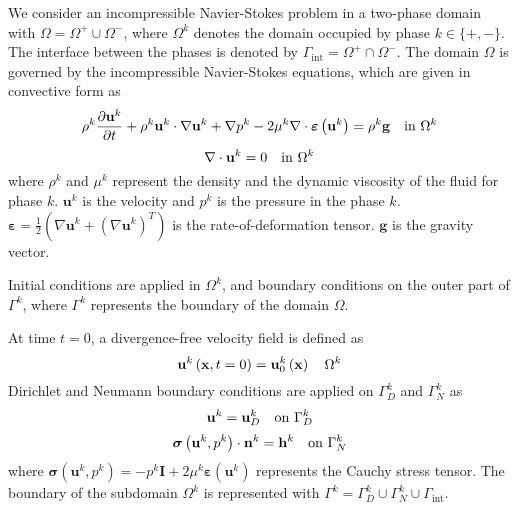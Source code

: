We consider an incompressible Navier-Stokes problem in a two-phase domain with $\Omega = \Omega^{+} \cup \Omega^{-}$, where $\Omega^{k}$ denotes the domain occupied by phase $k \in \lbrace +, - \rbrace$. The interface between the phases is denoted by $\Gamma_{\mathrm{int}} = \Omega^{+} \cap \Omega^{-}$. The domain $\Omega$ is governed by the incompressible Navier-Stokes equations, which are given in convective form as
%
\begin{equation}
	\centering
	\label{eq:incompressible_Navier_Stokes}
	\rho^{k} \frac{\partial \mathbf{u}^{k}}{\partial t}	+ 
	\rho^{k} \mathbf{u}^{k} \cdot \nabla \mathbf{u}^{k} +
	\nabla p^{k} - 2\mu^{k} \nabla \cdot \boldsymbol{\varepsilon} \left( \mathbf{u}^{k} \right) = \rho^{k} \mathbf{g} \quad \text{in $\Omega^{k}$}
\end{equation}
%
\begin{equation}
	\centering
	\label{fig:incompressibility}
	\nabla \cdot \mathbf{u}^{k} = 0 \quad \text{in $\Omega^{k}$}
\end{equation}
%
\noindent
where $\rho^{k}$ and $\mu^{k}$ represent the density and the dynamic viscosity of the fluid for phase $k$.  $\mathbf{u}^{k}$ is the velocity and $p^{k}$ is the pressure in the phase $k$. $\boldsymbol{\varepsilon} = \frac{1}{2} \left( \nabla \mathbf{u}^k + \left( \nabla \mathbf{u}^k \right)^{T} \right)$ is the rate-of-deformation tensor. $\mathbf{g}$ is the gravity vector.

Initial conditions are applied in $\Omega^{k}$, and boundary conditions on the outer part of $\Gamma^{k}$, where $\Gamma^{k}$ represents the boundary of the domain $\Omega$.

At time $t=0$, a divergence-free velocity field is defined as
%
\begin{equation}
	\centering
	\label{eq:initial_conditions}
	\mathbf{u}^{k}\left( \mathbf{x}, t=0 \right) = \mathbf{u}^{k}_{0}\left( \mathbf{x} \right) \quad \text{$\Omega^{k}$}
\end{equation}
%
Dirichlet and Neumann boundary conditions are applied on $\Gamma_{D}^{k}$ and $\Gamma_{N}^{k}$ as
%
\begin{equation}
	\centering
	\label{eq:dirichlet_boundary_conditions}
	\mathbf{u}^{k} = \mathbf{u}^{k}_{D} \quad \text{on $\Gamma^{k}_{D}$}
\end{equation}
%
\begin{equation}
	\centering
	\label{eq:neumann_boundary_conditions}
	\boldsymbol{\sigma}\left(\mathbf{u}^{k},p^{k}\right) \cdot \mathbf{n}^{k} = \mathbf{h}^{k} \quad \text{on $\Gamma^{k}_{N}$}
\end{equation}
%
\noindent
where $\boldsymbol{\sigma}\left(\mathbf{u}^{k},p^{k}\right) = -p^{k}\mathbf{I} + 2\mu^{k}\boldsymbol{\varepsilon} \left( \mathbf{u}^{k} \right)$ represents the Cauchy stress tensor. The boundary of the subdomain $\Omega^{k}$ is represented with $\Gamma^{k} = \Gamma^{k}_{D} \cup \Gamma^{k}_{N} \cup \Gamma_{\mathrm{int}}$.

